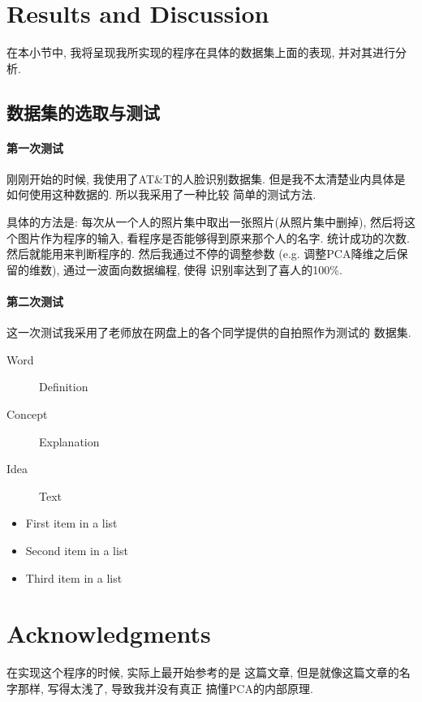 \documentclass[fleqn,10pt]{SelfArx} %
\begin{document}
\section{Results and Discussion}

在本小节中, 我将呈现我所实现的程序在具体的数据集上面的表现, 
并对其进行分析.
\subsection{数据集的选取与测试}
	\paragraph{第一次测试}
		刚刚开始的时候, 我使用了AT\&T的人脸识别数据集.
		但是我不太清楚业内具体是如何使用这种数据的. 所以我采用了一种比较
		简单的测试方法. 

		具体的方法是: 每次从一个人的照片集中取出一张照片(从照片集中删掉),
		然后将这个图片作为程序的输入, 看程序是否能够得到原来那个人的名字.
		统计成功的次数. 然后就能用来判断程序的. 然后我通过不停的调整参数
		(e.g. 调整PCA降维之后保留的维数), 通过一波面向数据编程, 使得
		识别率达到了喜人的100\%.

	\paragraph{第二次测试}
		这一次测试我采用了老师放在网盘上的各个同学提供的自拍照作为测试的
		数据集.

\begin{description}
\item[Word] Definition
\item[Concept] Explanation
\item[Idea] Text
\end{description}

\begin{itemize}[noitemsep] %
\item First item in a list
\item Second item in a list
\item Third item in a list
\end{itemize}


\section*{Acknowledgments} %
在实现这个程序的时候, 实际上最开始参考的是\cite{tutorial:PCA}
这篇文章, 但是就像这篇文章的名字那样, 写得太浅了, 导致我并没有真正
搞懂PCA的内部原理.
\end{document}
